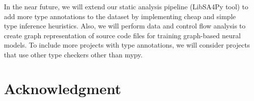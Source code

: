 \documentclass[10pt, conference]{IEEEtran}
\begin{document}
In the near future, we will extend our static analysis pipeline (LibSA4Py tool) to add more type annotations to the dataset by implementing cheap and simple type inference heuristics. Also, we will perform data and control flow analysis to create graph representation of source code files for training graph-based neural models. To include more projects with type annotations, we will consider projects that use other type checkers other than mypy.

\section*{Acknowledgment}



\end{document}
